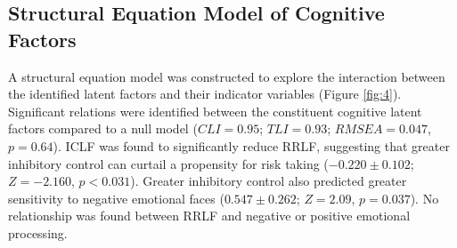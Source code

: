 \documentclass[utf8]{frontiersSCNS} %
\begin{document}
\subsection{Structural Equation Model of Cognitive Factors} A structural equation model was constructed to explore the interaction between the identified latent factors and their indicator variables (Figure \ref{fig:4}). Significant relations were identified between the constituent cognitive latent factors compared to a null model ($CLI = 0.95$; $TLI = 0.93$; $RMSEA = 0.047$, $p = 0.64$). ICLF was found to significantly reduce RRLF, suggesting that greater inhibitory control can curtail a propensity for risk taking ($-0.220\pm0.102$; $Z=-2.160$, $p<0.031$). Greater inhibitory control also predicted greater sensitivity to negative emotional faces ($0.547\pm0.262$; $Z=2.09$, $p = 0.037$). No relationship was found between RRLF and negative or positive emotional processing.
\end{document}

